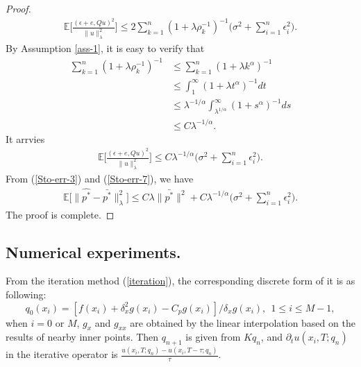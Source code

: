 \documentclass[11pt]{article}
\numberwithin{equation}{section}
\begin{document}
\begin{proof}
\begin{align*}
\mathbb{E}\bigg[\frac{(\epsilon+e,Qu)^2}{\| u\|_{\lambda}^2}\bigg]
\leq 2\sum_{k=1}^n(1+\lambda\rho_k^{-1})^{-1}\bigg(\sigma^2+\sum_{i=1}^n\epsilon_i^2\bigg).
\end{align*}
By Assumption \ref{ass-1}, it is easy to verify that
\begin{align*}
\sum_{k=1}^n(1+\lambda\rho_k^{-1})^{-1}
&\leq \sum_{k=1}^n(1+\lambda k^{\alpha})^{-1}\\
&\leq \int_1^{\infty}(1+\lambda t^{\alpha})^{-1}dt\\
&\leq \lambda^{-1/\alpha}\int_{\lambda^{1/\alpha}}^{\infty}(1+ s^{\alpha})^{-1}ds\\
&\leq C\lambda^{-1/\alpha}.
\end{align*}
It arrvies 
\begin{align}\label{Sto-err-7}
\mathbb{E}\bigg[\frac{(\epsilon+e,Qu)^2}{\| u\|_{\lambda}^2}\bigg]
\leq C\lambda^{-1/\alpha}\bigg(\sigma^2+\sum_{i=1}^n\epsilon_i^2\bigg).
\end{align}
From (\ref{Sto-err-3}) and (\ref{Sto-err-7}), we have
\begin{align*}
\mathbb{E}\big[\| \hat{p^*}-\bar{p^*}\|_{\lambda}^2\big]\leq C\lambda\|\bar{p^*}\|^2+C\lambda^{-1/\alpha}\bigg(\sigma^2+\sum_{i=1}^n\epsilon_i^2\bigg).
\end{align*}
The proof is complete. 
\end{proof} 

\fi


\subsection{Numerical experiments.}
From the iteration method (\ref{iteration}), the corresponding discrete form of it is as following:
\begin{equation}\label{iteration-ds}
 q_0(x_i)=[f(x_i)+\delta_x^2g(x_i)-C_pg(x_i)]/\delta_xg(x_i),~~ 1\le i\le M-1,
\end{equation}
when $i=0$ or $M$, $g_{x}$ and $g_{xx}$ are obtained by the linear interpolation based on the results of nearby inner points.
Then $q_{n+1}$ is given from $Kq_n$, and $\partial_tu(x_i,T;q_n)$ in the iterative operator is $\frac{u(x_i,T;q_n)-u(x_i,T-\tau;q_n)}{\tau}$. 
\end{document}

